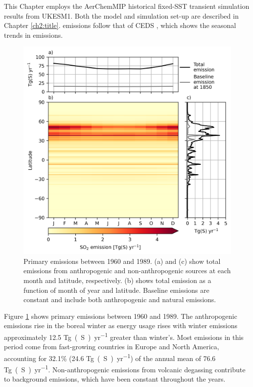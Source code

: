 This Chapter employs the AerChemMIP historical fixed-SST transient simulation results from UKESM1. Both the model and simulation set-up are described in Chapter \ref{ch2:title}.  emissions follow that of CEDS \citep{HoeslyHistoricalEmissions2017}, which shows the seasonal trends in  emissions. 

\begin{figure}
    \centering
    \includegraphics{Chapter4/Figs/emiso2_monthly_pothole.png}
    \caption[Primary  emissions between 1960 and 1989]{Primary  emissions between 1960 and 1989. (a) and (c) show total  emissions from anthropogenic and non-anthropogenic sources at each month and latitude, respectively. (b) shows total emission as a function of month of year and latitude. Baseline emissions are constant and include both anthropogenic and natural emissions.}
    \label{fig:ch4:seasonal-emission}
\end{figure}

Figure \ref{fig:ch4:seasonal-emission} shows primary  emissions between 1960 and 1989. The anthropogenic emissions rise in the boreal winter as energy usage rises with winter emissions approximately 12.5 \unit{Tg(S)~yr^{-1}} greater than winter's. Most emissions in this period come from fast-growing countries in Europe and North America, accounting for 32.1\% (24.6  \unit{Tg(S)~yr^{-1}}) of the annual mean of 76.6 \unit{Tg(S)~yr^{-1}}. Non-anthropogenic emissions from volcanic degassing contribute to background emissions, which have been constant throughout the years.



